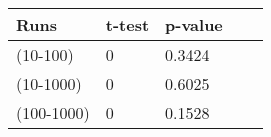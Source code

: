 
\begin{tabular}{lllll}

{\bf Runs} & {\bf t-test} & {\bf p-value}  \\ \hline

(10-100) & 0 & 0.3424  \\
(10-1000) & 0 & 0.6025 \\
(100-1000) & 0 & 0.1528 \\

\hline
\end{tabular}
